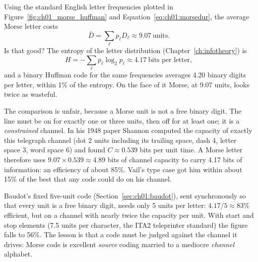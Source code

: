 

\begin{worked}
Using the standard English letter frequencies plotted in Figure~\ref{fig:ch01_morse_huffman} and
Equation~\eqref{eq:ch01:morsedur}, the average Morse letter costs
\[
\bar D = \sum_\ell p_\ell D_\ell \approx 9.07\ \text{units}.
\]
Is that good? The entropy of the letter distribution (Chapter~\ref{ch:infotheory}) is
\[
H = -\sum_\ell p_\ell\log_2 p_\ell \approx 4.17\ \text{bits per letter},
\]
and a binary Huffman code for the same frequencies averages 4.20 binary digits per letter,
within 1\% of the entropy. On the face of it Morse, at 9.07 units, looks twice as wasteful.

The comparison is unfair, because a Morse unit is not a free binary digit. The line must be on
for exactly one or three units, then off for at least one; it is a \emph{constrained} channel. In
his 1948 paper Shannon computed the capacity of exactly this telegraph channel (dot 2 units
including its trailing space, dash 4, letter space 3, word space 6) and found
$C\approx0.539$ bits per unit time. A Morse letter therefore uses $9.07\times0.539\approx4.89$ bits
of channel capacity to carry 4.17 bits of information: an efficiency of about 85\%. Vail's type
case got him within about 15\% of the best that any code could do on his channel.

Baudot's fixed five-unit code (Section~\ref{sec:ch01:baudot}), sent synchronously so that every unit
is a free binary digit, needs only 5 units per letter: $4.17/5\approx83$\% efficient, but on a
channel with nearly twice the capacity per unit. With start and stop elements (7.5 units per
character, the ITA2 teleprinter standard) the figure falls to 56\%. The lesson is that a code
must be judged against the channel it drives: Morse code is excellent \emph{source} coding
married to a mediocre \emph{channel} alphabet.
\end{worked}

